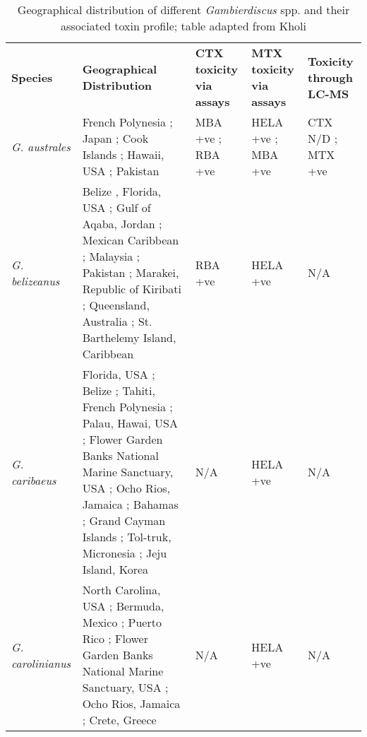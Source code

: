 \documentclass[12pt]{article}
\begin{document}
	
	
	\begin{longtable}{  p{2cm}  p{5.5cm}  p{2.3cm}  p{2.3cm}  p{2.3cm}  }
	\caption{Geographical distribution of different \emph{Gambierdiscus} spp. and their associated toxin profile; table adapted from Kholi \cite{kohli2013Gambierdiscus}} \\
	\label{tbl:GeoTable}
	\textbf{Species} & \textbf{Geographical Distribution} & \textbf{CTX toxicity via assays} & \textbf{MTX toxicity via assays} & \textbf{Toxicity through LC-MS} \\
	\emph{G. australes} & French Polynesia \cite{chinain1999morphology}; Japan \cite{nishimura2013genetic}; Cook Islands \cite{rhodes2010toxic}; Hawaii, USA \cite{litaker2009taxonomy}; Pakistan \cite{munir2011occurrence} & MBA +ve \cite{rhodes2010toxic}; RBA +ve \cite{chinain2010growth} & HELA +ve \cite{holland2013differences}; MBA +ve \cite{rhodes2010toxic} & CTX N/D \cite{}; MTX +ve \cite{}\\
	\emph{G. belizeanus} & Belize \cite{faust1995observation}, Florida, USA \cite{litaker2009taxonomy}; Gulf of Aqaba, Jordan \cite{saburova2013new}; Mexican Caribbean \cite{hernandez2004species}; Malaysia \cite{leaw2011first}; Pakistan \cite{munir2011occurrence}; Marakei, Republic of Kiribati \cite{xu2014distribution}; Queensland, Australia \cite{}; St. Barthelemy Island, Caribbean \cite{litaker2010global} & RBA +ve \cite{chinain2010growth} & HELA +ve \cite{holland2013differences} & N/A \\ %
	\emph{G. caribaeus} & Florida, USA \cite{litaker2009taxonomy}; Belize \cite{litaker2009taxonomy}; Tahiti, French Polynesia \cite{litaker2009taxonomy}; Palau, Hawai, USA \cite{litaker2009taxonomy}; Flower Garden Banks National Marine Sanctuary, USA \cite{holland2013differences}; Ocho Rios, Jamaica \cite{}; Bahamas \cite{litaker2010global}; Grand Cayman Islands \cite{}; Tol-truk, Micronesia \cite{litaker2010global}; Jeju Island, Korea \cite{jeong2012first} & N/A & HELA +ve \cite{holland2013differences} & N/A \\
	\emph{G. carolinianus} & North Carolina, USA \cite{litaker2009taxonomy}; Bermuda, Mexico \cite{litaker2010global}; Puerto Rico \cite{holland2013differences}; Flower Garden Banks National Marine Sanctuary, USA \cite{holland2013differences}; Ocho Rios, Jamaica \cite{holland2013differences}; Crete, Greece \cite{holland2013differences} & N/A & HELA +ve \cite{holland2013differences} & N/A\\

\end{longtable}
\end{document}
